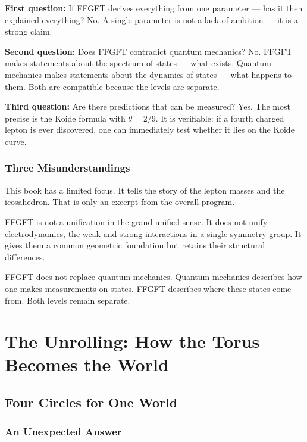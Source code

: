 \documentclass[12pt,oneside]{book}
\begin{document}
\textbf{First question:} If FFGFT derives everything from one parameter --- has it then explained everything? No. A single parameter is not a lack of ambition --- it is a strong claim.

\textbf{Second question:} Does FFGFT contradict quantum mechanics? No. FFGFT makes statements about the spectrum of states --- what exists. Quantum mechanics makes statements about the dynamics of states --- what happens to them. Both are compatible because the levels are separate.

\textbf{Third question:} Are there predictions that can be measured? Yes. The most precise is the Koide formula with $\theta = 2/9$. It is verifiable: if a fourth charged lepton is ever discovered, one can immediately test whether it lies on the Koide curve.

\section{Three Misunderstandings}

This book has a limited focus. It tells the story of the lepton masses and the icosa\-hedron. That is only an excerpt from the overall program.

FFGFT is not a unification in the grand-unified sense. It does not unify electrodynamics, the weak and strong interactions in a single symmetry group. It gives them a common geometric foundation but retains their structural differences.

FFGFT does not replace quantum mechanics. Quantum mechanics describes how one makes measurements on states. FFGFT describes where these states come from. Both levels remain separate.

\part{The Unrolling: How the Torus Becomes the World}

\chapter{Four Circles for One World}

\section{An Unexpected Answer}
\end{document}

